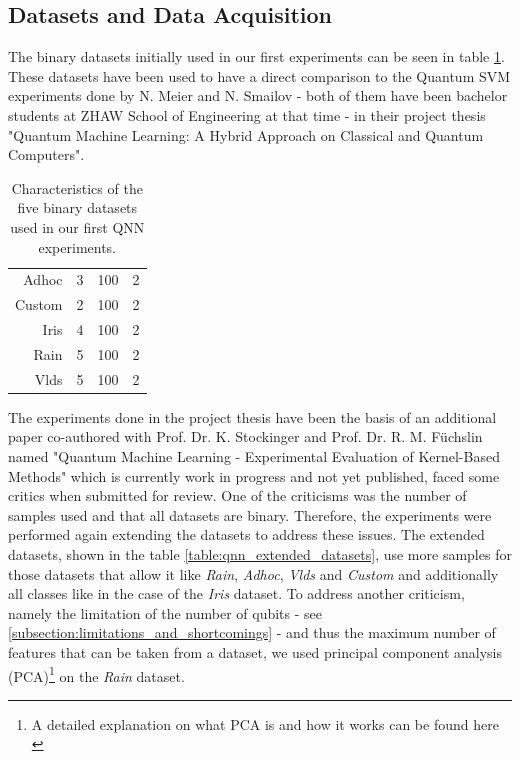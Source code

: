 \subsection{Datasets and Data Acquisition}
\label{subsection:qnn_datasets_and_acqusition}
The binary datasets initially used in our first experiments can be seen in table \ref{table:qnn_binary_datasets}. These datasets have been used to have a direct comparison to the Quantum SVM experiments done by N. Meier and N. Smailov - both of them have been bachelor students at ZHAW School of Engineering at that time - in their project thesis "Quantum Machine Learning: A Hybrid Approach on Classical and Quantum Computers"\cite{smailovQuantumMachineLearning2021}.

\begin{table}[!h]
	\centering
	\begin{tabular}{rccc}
		\hline 
		\thead{\textbf{Dataset}} & \thead{\textbf{\#Features}} & \thead{\textbf{\#Records}} & \thead{\textbf{\#Classes}} \\
		\hline 
		Adhoc   & 3         & 100      & 2        \\
		Custom  & 2         & 100      & 2        \\
		Iris    & 4         & 100      & 2        \\
		Rain    & 5         & 100      & 2        \\
		Vlds    & 5         & 100      & 2        \\
		\hline
	\end{tabular}
	\caption{Characteristics of the five binary datasets used in our first QNN experiments.}
	\label{table:qnn_binary_datasets}
\end{table}

The experiments done in the project thesis have been the basis of an additional paper co-authored with Prof. Dr. K. Stockinger and Prof. Dr. R. M. Füchslin named "Quantum Machine Learning - Experimental Evaluation of Kernel-Based Methods" which is currently work in progress and not yet published, faced some critics when submitted for review. 
One of the criticisms was the number of samples used and that all datasets are binary. Therefore, the experiments were performed again extending the datasets to address these issues. The extended datasets, shown in the table \ref{table:qnn_extended_datasets}, use more samples for those datasets that allow it like \textit{Rain}, \textit{Adhoc}, \textit{Vlds} and \textit{Custom} and additionally all classes like in the case of the \textit{Iris} dataset. To address another criticism, namely the limitation of the number of qubits - see \ref{subsection:limitations_and_shortcomings} - and thus the maximum number of features that can be taken from a dataset, we used principal component analysis (PCA)\footnote{A detailed explanation on what PCA is and how it works can be found here \cite{bro2014principal}} on the \textit{Rain} dataset.

